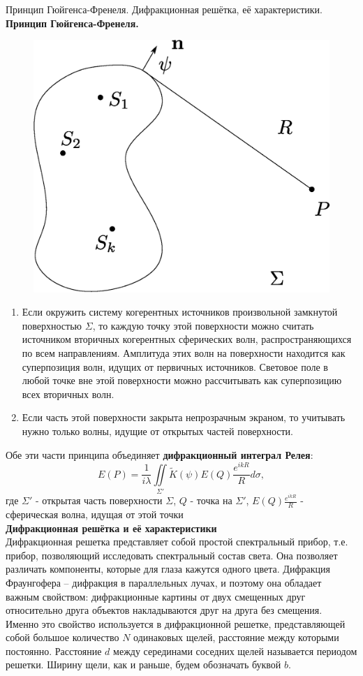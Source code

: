\documentclass[__main__.tex]{subfiles}
\begin{document}
Принцип Гюйгенса-Френеля. Дифракционная решётка, её характеристики.\\ 

\textbf{Принцип Гюйгенса-Френеля. }\\

\begin{figure}[h]
	\begin{center}
		\includegraphics[width=0.5\linewidth]{img/o-08_1.eps}
	\end{center}
\end{figure}
\begin{enumerate}
\item
Если окружить систему когерентных источников произвольной замкнутой поверхностью $\Sigma$, то каждую точку этой поверхности можно считать источником вторичных когерентных сферических волн, распространяющихся по всем направлениям. Амплитуда этих волн на поверхности находится как суперпозиция волн, идущих от первичных источников. Световое поле в любой точке вне этой поверхности можно рассчитывать как суперпозицию всех вторичных волн. 
\item
Если часть этой поверхности закрыта непрозрачным экраном, то учитывать нужно только волны, идущие от открытых частей поверхности.\\
\end{enumerate}


Обе эти части принципа объединяет \textbf{дифракционный интеграл Релея}:
$$E(P) = \frac{1}{i\lambda}\iint\limits_{\Sigma'} \widetilde K(\psi) E(Q)\frac{e^{ikR}}{R}d\sigma,$$
где $\Sigma'$ - открытая часть поверхности $\Sigma$, $Q$ - точка на $\Sigma'$, $E(Q)\frac{e^{ikR}}{R}$ - сферическая волна, идущая от этой точки\\ 
\textbf{Дифракционная решётка и её характеристики}\\

Дифракционная решетка представляет собой простой спектральный прибор, т.е. прибор, позволяющий исследовать спектральный состав света. Она позволяет различать компоненты, которые для глаза кажутся одного цвета.
Дифракция Фраунгофера – дифракция в параллельных лучах, и поэтому она обладает важным свойством: дифракционные картины от двух смещенных друг относительно друга объектов накладываются друг на друга без смещения. Именно это свойство используется в дифракционной решетке, представляющей собой большое количество $N$ одинаковых щелей, расстояние между которыми постоянно. Расстояние  $d$  между серединами соседних щелей называется периодом решетки. Ширину щели, как и раньше, будем обозначать буквой $b$.
\end{document}
